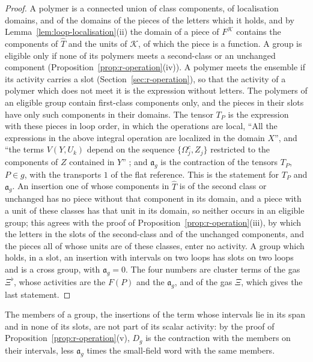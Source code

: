 \documentclass[11pt]{preprint}
\numberwithin{equation}{section}
\theoremstyle{definition}
\theoremstyle{remark}
\theoremstyle{plain}
\begin{document}
\begin{proof}
A polymer is a connected union of class components, of localisation domains, and of the domains of the pieces of the letters which it holds, and by Lemma~\ref{lem:loop-localisation}(ii) the domain of a piece of $F^{\mathcal K}$ contains the components of $\hat T$ and the units of $\mathcal K$, of which the piece is a function. A group is eligible only if none of its polymers meets a second-class or an unchanged component (Proposition~\ref{prop:r-operation}(iv)). A polymer meets the ensemble if its activity carries a slot (Section~\ref{sec:r-operation}), so that the activity of a polymer which does not meet it is the expression \cite[(1.91)]{BalabanLFR2} without letters. The polymers of an eligible group contain first-class components only, and the pieces in their slots have only such components in their domains. The tensor $T_P$ is the expression \cite[(1.91)]{BalabanLFR2} with these pieces in loop order, in which the operations are local, ``All the expressions in the above integral operation are localized in the domain $X$'', and ``the terms $V(Y,U_k)$ depend on the sequence $\{\Omega_j^c,Z_j\}$ restricted to the components of $Z$ contained in $Y$'' \cite[p.~379]{BalabanLFR2}; and $\mathfrak a_g$ is the contraction of the tensors $T_P$, $P \in g$, with the transports $1$ of the flat reference. This is the statement for $T_P$ and $\mathfrak a_g$. An insertion one of whose components in $\hat T$ is of the second class or unchanged has no piece without that component in its domain, and a piece with a unit of these classes has that unit in its domain, so neither occurs in an eligible group; this agrees with the proof of Proposition~\ref{prop:r-operation}(iii), by which the letters in the slots of the second-class and of the unchanged components, and the pieces all of whose units are of these classes, enter no activity. A group which holds, in a slot, an insertion with intervals on two loops has slots on two loops and is a cross group, with $\mathfrak a_g = 0$. The four numbers are cluster terms of the gas $\Xi^\flat$, whose activities are the $F(P)$ and the $\mathfrak a_g$, and of the gas $\Xi$, which gives the last statement.
\end{proof}

The members of a group, the insertions of the term whose intervals lie in its span and in none of its slots, are not part of its scalar activity: by the proof of Proposition~\ref{prop:r-operation}(v), $D_g$ is the contraction with the members on their intervals, less $\mathfrak a_g$ times the small-field word with the same members.
\end{document}
